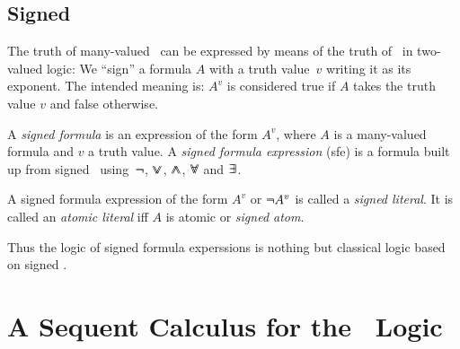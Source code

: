 \documentclass{article}
\begin{document}

\subsection*{Signed \Formulae}

The truth of many-valued \formulae\ can be expressed by means of the
truth of \formulae\ in two-valued logic:
We ``sign'' a formula $A$ with a truth value~$v$ writing it as
its exponent. The intended meaning is: $A^v$ is considered true
if $A$ takes the truth value $v$ and false otherwise.

\begin{definition}
A {\em signed formula\/} is an expression of the form $A^v$, where $A$ is
a many-valued formula and $v$ a truth value. A {\em signed formula
expression\/} (sfe) is a formula built up from signed \formulae\
using~$\sneg$, $\mathbin{\lor\mskip-10mu\lor}$, $\mathbin{\land\mskip-10mu \land}$, $\mathop{\forall\mskip-8mu\forall}$ and $\mathop{\exists\mskip-8mu\exists}$.

A signed formula expression of the form $A^v$ or $\sneg A^v$ is called a
{\em signed literal}. It is called an {\em atomic literal} iff $A$ is
atomic or {\em signed atom}.
\end{definition}

Thus the logic of signed formula experssions is nothing but classical
logic based on signed \formulae.






\section{A Sequent Calculus for the \NameOfLogic\ Logic}\label{sec:sequent}
\end{document}
